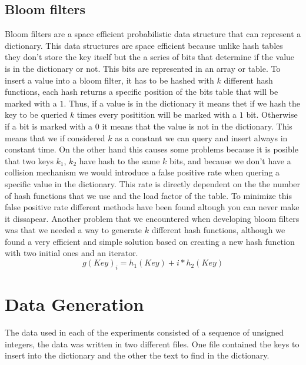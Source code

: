 \documentclass{article}
\begin{document}
    \subsection{Bloom filters}
	Bloom filters \cite{ARTICLE:4} are a space efficient probabilistic data structure that can represent a dictionary. This data structures are space efficient because 
	unlike hash tables they don't store the key itself but the a series of bits that determine if the value is in the dictionary or not. This bits are represented in an array 
	or table. To insert a value into a bloom filter, it has to be hashed with $k$ different hash functions, each hash returns a specific position of the bits table that will be 
	marked with a $1$. Thus, if a value is in the dictionary it means thet if we hash the key to be queried $k$ times every positition will be marked with a $1$ bit. Otherwise 
	if a bit is marked with a $0$ it means that the value is not in the dictionary. This means that we if considered $k$ as a constant we can query and insert always in constant time. 
	On the other hand this causes some problems because it is posible that two keys $k_1$, $k_2$ have hash to the same $k$ bits, and because we don't have a collision mechanism we would introduce 
	a false positive rate when quering a specific value in the dictionary. This rate is directly dependent on the the number of hash functions that we use and the load factor of the table. 
	To minimize \cite{ARTICLE:1} this false positive rate different methods have been found altough you can never make it dissapear. Another problem that we encountered when developing bloom filters 
	was that we needed a way to generate $k$ different hash functions, although we found a very efficient and simple solution \cite{ARTICLE:3} based on creating a new hash function with two initial ones and 
	an iterator. 
	\begin{equation}
	g(Key)_i = h_1(Key) + i * h_2(Key)
	\end{equation}
	
    \section{Data Generation}
        The data used in each of the experiments consisted of a sequence of unsigned integers,  
        the data was written in two different files. One file contained the keys to insert into the dictionary and the other the text to find in the dictionary. 
       
\end{document}
